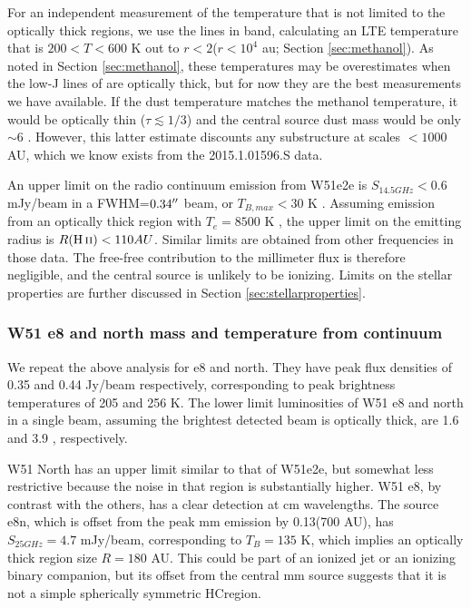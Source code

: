 \documentclass{emulateapj}
\begin{document}
For an independent measurement of the temperature that is not limited to the
optically thick regions, we use the \methanol lines in band, calculating an LTE
temperature that is $200 < T < 600$ K out to $r<2$\arcsec ($r<10^4$ au; Section
\ref{sec:methanol}).  As noted in Section \ref{sec:methanol}, these
temperatures may be overestimates when the low-J lines of \methanol are
optically thick, but for now they are the best measurements we have available.
If the dust temperature matches the methanol temperature, it would be optically
thin ($\tau \lesssim 1/3$) and the central source dust mass would be only
$\sim6$ \msun.  However, this latter estimate discounts any substructure at
scales $<1000$ AU, which we know exists from the 2015.1.01596.S data.

An upper limit on the radio continuum emission from W51e2e is $S_{14.5 GHz} <
0.6$ mJy/beam in a FWHM=$0.34\mbox{$^{\prime\prime}$}$ beam, or $T_{B,max} < 30$ K
\citep{Ginsburg2016b}.  Assuming emission from an optically thick \hii region
with $T_e = 8500$ K \citep{Ginsburg2015a}, the upper limit on the emitting
radius is $R(\hii) < 110 AU$.  Similar limits are obtained from other
frequencies in those data.  The free-free contribution to the millimeter
flux is therefore negligible, and the central source is unlikely to be
ionizing.  Limits on the stellar properties are further discussed in
Section \ref{sec:stellarproperties}.


\subsubsection{W51 e8 and north mass and temperature from continuum}
\label{sec:w51e8andnorth}
We repeat the above analysis for e8 and north.  They have peak flux densities
of 0.35 and 0.44 Jy/beam respectively, corresponding to peak brightness
temperatures of 205 and 256 K.
The lower limit luminosities of W51 e8 and north in a single beam, assuming the
brightest detected beam is optically thick, are 1.6 and 3.9 \lsun,
respectively.


W51 North has an upper limit similar to that of W51e2e, but somewhat less
restrictive because the noise in that region is substantially higher.  W51 e8,
by contrast with the others, has a clear detection at cm wavelengths.  The
source e8n, which is offset from the peak mm emission by 0.13\arcsec (700 AU),
has $S_{25 GHz}=4.7$ mJy/beam, corresponding to $T_B=135$ K, which implies an
optically thick \hii region size $R=180$ AU.  This could be part of an ionized
jet or an ionizing binary companion, but its offset from the central mm source
suggests that it is not a simple spherically symmetric HC\hii region.
\end{document}

